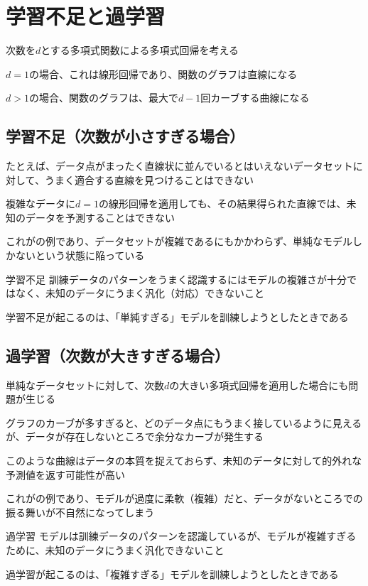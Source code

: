 \documentclass[../../../topic_machine-learning]{subfiles}
\begin{document}
\sectionline
\section{学習不足と過学習}

次数を$d$とする多項式関数による多項式回帰を考える

\br

$d = 1$の場合、これは線形回帰であり、関数のグラフは直線になる

$d > 1$の場合、関数のグラフは、最大で$d-1$回カーブする曲線になる

\subsection{学習不足（次数が小さすぎる場合）}

たとえば、データ点がまったく直線状に並んでいるとはいえないデータセットに対して、うまく適合する直線を見つけることはできない

複雑なデータに$d = 1$の線形回帰を適用しても、その結果得られた直線では、未知のデータを予測することはできない

\br

これがの例であり、データセットが複雑であるにもかかわらず、単純なモデルしかないという状態に陥っている

\begin{definition}{学習不足}
  訓練データのパターンをうまく認識するにはモデルの複雑さが十分ではなく、未知のデータにうまく汎化（対応）できないこと
\end{definition}

学習不足が起こるのは、「単純すぎる」モデルを訓練しようとしたときである

\subsection{過学習（次数が大きすぎる場合）}

単純なデータセットに対して、次数$d$の大きい多項式回帰を適用した場合にも問題が生じる

\br

グラフのカーブが多すぎると、どのデータ点にもうまく接しているように見えるが、データが存在しないところで余分なカーブが発生する

このような曲線はデータの本質を捉えておらず、未知のデータに対して的外れな予測値を返す可能性が高い

\br

これがの例であり、モデルが過度に柔軟（複雑）だと、データがないところでの振る舞いが不自然になってしまう

\begin{definition}{過学習}
  モデルは訓練データのパターンを認識しているが、モデルが複雑すぎるために、未知のデータにうまく汎化できないこと
\end{definition}

過学習が起こるのは、「複雑すぎる」モデルを訓練しようとしたときである
\end{document}
